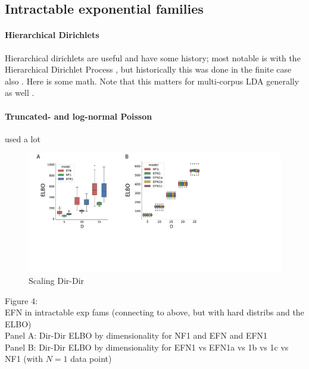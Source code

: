 \documentclass{article}
\begin{document}
\subsection{Intractable exponential families}


\paragraph{Hierarchical Dirichlets}

Hierarchical dirichlets are useful and have some history; most notable is with the  Hierarchical Dirichlet Process \cite{teh2006hdp}, but historically this was done in the finite case also \cite{mackay1995hierarchical}.  Here is some math.    Note that this matters for multi-corpus LDA generally as well \cite{blei2003latent, pritchard2000inference}.


\paragraph{Truncated- and log-normal Poisson}

used a lot \cite{gao2016linear}\cite{adams2009tractable}\cite{cunningham2008fast,cunningham2008inferring}


 \begin{figure}
  \centering
\includegraphics[scale=0.46]{figs/fig4/fig4.pdf}
  \caption{Scaling Dir-Dir}
\end{figure}



Figure 4: \\
EFN in intractable exp fams (connecting to above, but with hard distribs and the ELBO) \\
Panel A: Dir-Dir ELBO by dimensionality for NF1 and EFN and EFN1\\
Panel B: Dir-Dir ELBO by dimensionality for EFN1 vs EFN1a vs 1b vs 1c vs NF1 (with $N=1$ data point)\\
\end{document}
